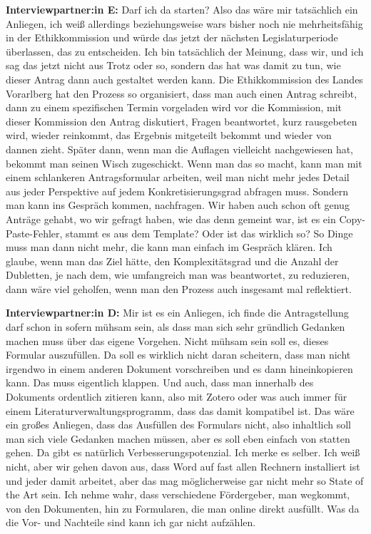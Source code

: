 \documentclass[a4paper,12pt,twoside,numbers=noendperiod]{scrreprt}
\begin{document}
\textbf{Interviewpartner:in E:} Darf ich da starten? Also das wäre mir tatsächlich ein Anliegen, ich weiß allerdings beziehungsweise wars bisher noch nie mehrheitsfähig in der Ethikkommission und würde das jetzt der nächsten Legislaturperiode überlassen, das zu entscheiden. Ich bin tatsächlich der Meinung, dass wir, und ich sag das jetzt nicht aus Trotz oder so, sondern das hat was damit zu tun, wie dieser Antrag dann auch gestaltet werden kann. Die Ethikkommission des Landes Vorarlberg hat den Prozess so organisiert, dass man auch einen Antrag schreibt, dann zu einem spezifischen Termin vorgeladen wird vor die Kommission, mit dieser Kommission den Antrag diskutiert, Fragen beantwortet, kurz rausgebeten wird, wieder reinkommt, das Ergebnis mitgeteilt bekommt und wieder von dannen zieht. Später dann, wenn man die Auflagen vielleicht nachgewiesen hat, bekommt man seinen Wisch zugeschickt. Wenn man das so macht, kann man mit einem schlankeren Antragsformular arbeiten, weil man nicht mehr jedes Detail aus jeder Perspektive auf jedem Konkretisierungsgrad abfragen muss. Sondern man kann ins Gespräch kommen, nachfragen. Wir haben auch schon oft genug Anträge gehabt, wo wir gefragt haben, wie das denn gemeint war, ist es ein Copy-Paste-Fehler, stammt es aus dem Template? Oder ist das wirklich so? So Dinge muss man dann nicht mehr, die kann man einfach im Gespräch klären. Ich glaube, wenn man das Ziel hätte, den Komplexitätsgrad und die Anzahl der Dubletten, je nach dem, wie umfangreich man was beantwortet, zu reduzieren, dann wäre viel geholfen, wenn man den Prozess auch insgesamt mal reflektiert.

\textbf{Interviewpartner:in D:} Mir ist es ein Anliegen, ich finde die Antragstellung darf schon in sofern mühsam sein, als dass man sich sehr gründlich Gedanken machen muss über das eigene Vorgehen. Nicht mühsam sein soll es, dieses Formular auszufüllen. Da soll es wirklich nicht daran scheitern, dass man nicht irgendwo in einem anderen Dokument vorschreiben und es dann hineinkopieren kann. Das muss eigentlich klappen. Und auch, dass man innerhalb des Dokuments ordentlich zitieren kann, also mit Zotero oder was auch immer für einem Literaturverwaltungsprogramm, dass das damit kompatibel ist. Das wäre ein großes Anliegen, dass das Ausfüllen des Formulars nicht, also inhaltlich soll man sich viele Gedanken machen müssen, aber es soll eben einfach von statten gehen. Da gibt es natürlich Verbesserungspotenzial. Ich merke es selber. Ich weiß nicht, aber wir gehen davon aus, dass Word auf fast allen Rechnern installiert ist und jeder damit arbeitet, aber das mag möglicherweise gar nicht mehr so State of the Art sein. Ich nehme wahr, dass verschiedene Fördergeber, man wegkommt, von den Dokumenten, hin zu Formularen, die man online direkt ausfüllt. Was da die Vor- und Nachteile sind kann ich gar nicht aufzählen.
\end{document}
